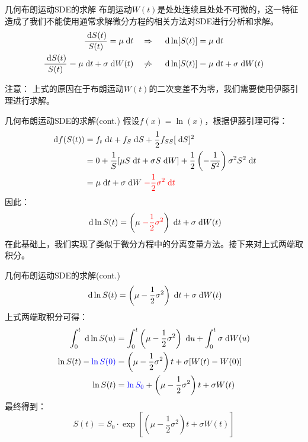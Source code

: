 \documentclass[t]{beamer}
\newcommand{\dif}{{\;\rm d}}
\begin{document}
\begin{frame}{几何布朗运动SDE的求解}
布朗运动$W(t)$是处处连续且处处不可微的，这一特征造成了我们不能使用通常求解微分方程的相关方法对SDE进行分析和求解。
\[\begin{split}
\frac{\dif S(t)}{S(t)}=\mu \dif t &\quad\Rightarrow\quad \dif \ln[S(t)]=\mu \dif t\\
\frac{\dif S(t)}{S(t)}=\mu \dif t+\sigma \dif W(t) &\quad\not\Rightarrow\quad \dif \ln[S(t)]=\mu \dif t+\sigma \dif W(t)
\end{split} \]

\begin{block}{注意：}
上式的原因在于布朗运动$W(t)$的二次变差不为零，我们需要使用伊藤引理进行求解。
\end{block}
\end{frame}

\begin{frame}{几何布朗运动SDE的求解(cont.)}
假设$f(x)=\ln(x)$，根据伊藤引理可得：
\begin{equation*}
\begin{split}
\dif f(S(t))&=f_t\dif t+f_S\dif S+\frac{1}{2}f_{SS}[\dif S]^2\\
&=0+\frac{1}{S}[\mu S\dif t+\sigma S \dif W]+\frac{1}{2}\left(-\frac{1}{S^2}\right)\sigma^2S^2\dif t\\
&=\mu \dif t+\sigma \dif W\;{\color{red}-\frac{1}{2}\sigma^2\dif t}\\
\end{split}
\end{equation*}
因此：
\begin{equation*}
\dif \ln S(t)=\left(\mu\;{\color{red}-\frac{1}{2}\sigma^2} \right) \dif t+\sigma\dif W(t)
\end{equation*}
在此基础上，我们实现了类似于微分方程中的分离变量方法。接下来对上式两端取积分。
\end{frame}

\begin{frame}{几何布朗运动SDE的求解(cont.)}\normalsize
\begin{equation*}
\dif \ln S(t)=\left(\mu -\frac{1}{2}\sigma^2  \right) \dif t+\sigma\dif W(t)
\end{equation*}
上式两端取积分可得：
\begin{align*}
\int^t_0\dif \ln S(u)&=\int^t_0\left(\mu-\frac{1}{2}\sigma^2 \right) \dif u+\int^t_0\sigma\dif W(u) \\
\ln S(t)-{\color{blue}\ln S(0)}&=\left(\mu-\frac{1}{2}\sigma^2 \right)t+ \sigma [W(t)-W(0)]\\
\ln S(t)&={\color{blue}\ln S_0}+\left(\mu-\frac{1}{2}\sigma^2 \right)t+ \sigma W(t)
\end{align*} 
最终得到：
\begin{equation*}
S(t)=S_0\cdot \exp\left[\left(\mu-\frac{1}{2}\sigma^2 \right)t+ \sigma W(t)\right]
\end{equation*}


\end{frame}
\end{document}
